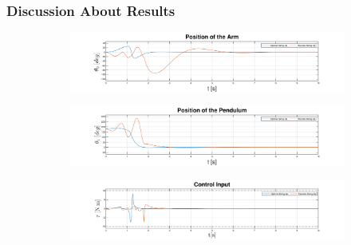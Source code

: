 \documentclass[]{beamer}
\begin{document}
\begin{frame}
	\frametitle{Discussion About Results}
	\begin{figure}[H]
		\begin{subfigure}
			\centering
			\includegraphics[scale=0.25]{images/Dswing/arm.pdf}  
		\end{subfigure}
		\begin{subfigure}
			\centering
			\includegraphics[scale=0.25]{images/Dswing/pend.pdf}  
		\end{subfigure}
		\begin{subfigure}
			\centering
			\includegraphics[scale=0.25]{images/Dswing/control.pdf} 
		\end{subfigure}
	\end{figure}
\end{frame}
\end{document}
